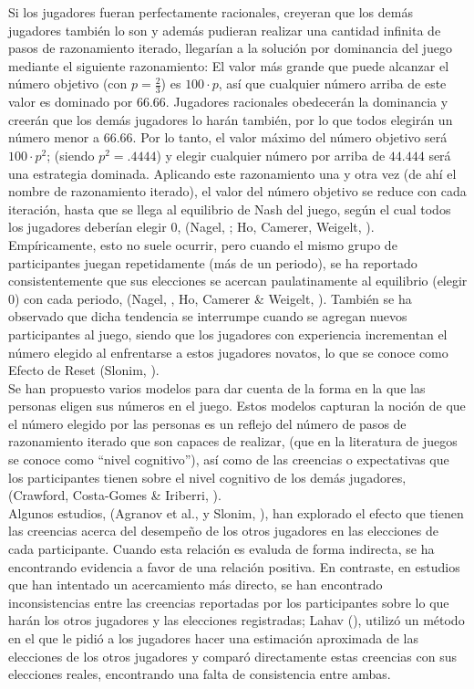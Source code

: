 Si los jugadores fueran perfectamente racionales, creyeran que los demás jugadores también lo son y además pudieran realizar una cantidad infinita de pasos de razonamiento iterado, llegarían a la solución por dominancia del juego mediante el siguiente razonamiento: El valor más grande que puede alcanzar el número objetivo (con $p = \frac{2}{3}$) es $100 \cdot p$, así que cualquier número arriba de este valor es dominado por $66.66$. Jugadores racionales obedecerán la dominancia y creerán que los demás jugadores lo harán también, por lo que todos elegirán un número menor a $66.66$. Por lo tanto, el valor máximo del número objetivo será $100 \cdot p^2$; (siendo $p^2=.4444$) y elegir cualquier número por arriba de $44.444$ será una estrategia dominada. Aplicando este razonamiento una y otra vez (de ahí el nombre de razonamiento iterado), el valor del número objetivo se reduce con cada iteración, hasta que se llega al equilibrio de Nash del juego, según el cual todos los jugadores deberían elegir $0$, (Nagel, \citeyear{Nagel}; Ho, Camerer, Weigelt, \citeyear{Ho}).\\

Empíricamente, esto no suele ocurrir, pero cuando el mismo grupo de participantes juegan repetidamente (más de un periodo), se ha reportado consistentemente que sus elecciones se acercan paulatinamente al equilibrio (elegir $0$) con cada periodo, (Nagel, \citeyear{Nagel}, Ho, Camerer & Weigelt, \citeyear{Ho}). También se ha observado que dicha tendencia se interrumpe cuando se agregan nuevos participantes al juego, siendo que los jugadores con experiencia incrementan el número elegido al enfrentarse a estos jugadores novatos, lo que se conoce como Efecto de Reset (Slonim, \citeyear{Slonim}).\\

Se han propuesto varios modelos para dar cuenta de la forma en la que las personas eligen sus números en el juego. Estos modelos capturan la noción de que el número elegido por las personas es un reflejo del número de pasos de razonamiento iterado que son capaces de realizar, (que en la literatura de juegos se conoce como “nivel cognitivo”), así como de las creencias o expectativas que los participantes tienen sobre el nivel cognitivo de los demás jugadores, (Crawford, Costa-Gomes & Iriberri, \citeyear{Crawford}).\\

Algunos estudios, (Agranov et al., \citeyear{Agranov} y Slonim, \citeyear{Slonim}),  han explorado el efecto que tienen las creencias acerca del desempeño de los otros jugadores en las elecciones de cada participante. Cuando esta relación es evaluda de forma indirecta, se ha encontrando evidencia a favor de una relación positiva. En contraste, en estudios que han intentado un acercamiento más directo, se han encontrado inconsistencias entre las creencias reportadas por los participantes sobre lo que harán los otros jugadores y las elecciones registradas; Lahav (\citeyear{Lahav}), utilizó un método en el que le pidió a los jugadores hacer una estimación aproximada de las elecciones de los otros jugadores y comparó directamente estas creencias con sus elecciones reales, encontrando una falta de consistencia entre ambas.\\

